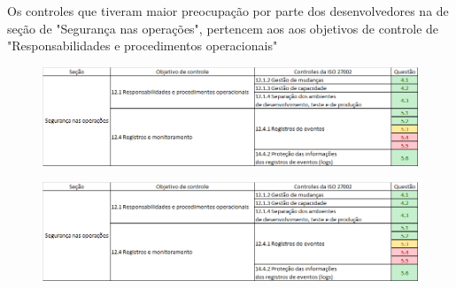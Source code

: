 Os controles que tiveram maior preocupação por parte dos desenvolvedores na de seção de "Segurança nas operações", pertencem aos aos objetivos de controle de "Responsabilidades e procedimentos operacionais" 
\begin{figure}[H]
\centering
\includegraphics[scale=0.7]{fig2/controles3.png}
\caption{}
\label{fig:cont}
\end{figure}


\begin{figure}[H]
\centering
\includegraphics[scale=0.7]{fig2/controles3.png}
\caption{}
\label{fig:cont}
\end{figure}